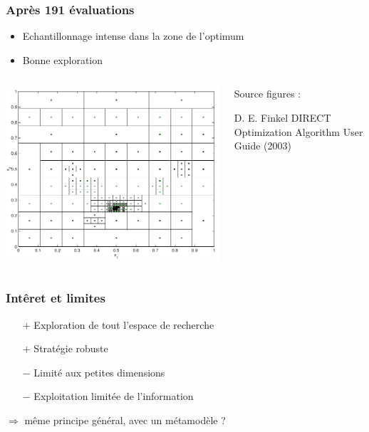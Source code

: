 \begin{frame}
\frametitle{Après 191 évaluations}
\begin{itemize}
 \item Echantillonnage intense dans la zone de l'optimum
 \item Bonne exploration 
\end{itemize}



\begin{columns}
 \begin{column}{80mm}
 \includegraphics[width=\textwidth]{fig/direct3.png}  
 \end{column}
 \begin{column}{40mm}
   \scriptsize{Source figures :
 \begin{thebibliography}{1}
\beamertemplatearticlebibitems
     D. E. Finkel
         \newblock DIRECT Optimization Algorithm User Guide (2003)
 \end{thebibliography}}
 \end{column}
\end{columns}
\end{frame}
\begin{frame}
\frametitle{Intêret et limites}
\begin{itemize}
 \item[$+$] Exploration de tout l'espace de recherche
 \item[$+$] Stratégie robuste
 \item[$-$] Limité aux petites dimensions
 \item[$-$] Exploitation limitée de l'information
\end{itemize}
\vspace{5mm}
$\Rightarrow$ même principe général, avec un métamodèle ?
\end{frame}
